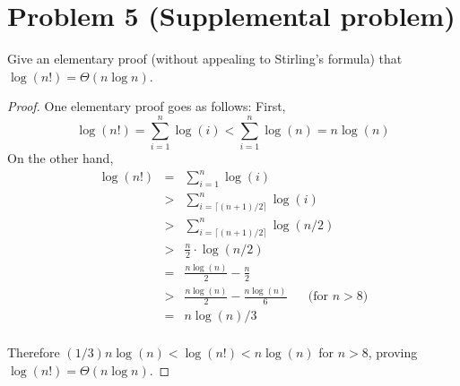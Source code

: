 \documentclass[14pt]{extarticle}
\newcommand{\dps}{\displaystyle}
\begin{document}
\section{Problem 5 (Supplemental problem)}
Give an elementary proof (without appealing to Stirling’s formula) that $\log(n!) = \Theta(n \log n)$.
\begin{proof}
One elementary proof goes as follows: First,
$$
\log(n!) = \sum_{i=1}^n \log(i) < \sum_{i=1}^n \log(n) = n\log(n)
$$
On the other hand,
$$
\begin{array}{rcl}
\log(n!) &=&\dps \sum_{i=1}^n \log(i) \\
&>&\dps\sum_{i=\lceil(n+1)/2\rceil}^n \log(i)\\
&>&\dps\sum_{i=\lceil(n+1)/2\rceil}^n \log(n/2)\\
&>&\dps\frac{n}{2}\cdot\log(n/2)\\
&=&\dps\frac{n\log(n)}{2} - \frac{n}{2}\\

&>&\dps\frac{n\log(n)}{2} - \frac{n\log(n)}{6}\,\,\,\,\,\,\,\,\,\,\text{(for } n>8)\\
&=&\dps n\log(n)/3\\
\end{array}
$$

Therefore $(1/3)n\log(n) < \log(n!) < n\log(n)$ for $n > 8$, proving $\log(n!) = \Theta(n \log n)$.
\end{proof}
\end{document}
